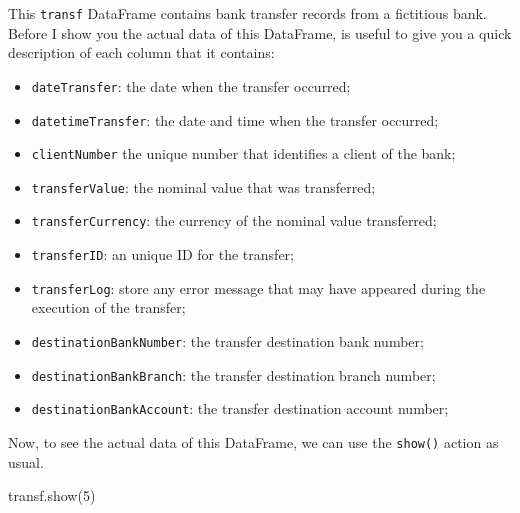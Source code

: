 \documentclass[
  11pt,
  letterpaper,
  DIV=11,
  numbers=noendperiod]{scrreprt}
\newenvironment{Shaded}{\begin{snugshade}}{\end{snugshade}}
\newcommand{\DecValTok}[1]{\textcolor[rgb]{0.68,0.00,0.00}{#1}}
\newcommand{\NormalTok}[1]{\textcolor[rgb]{0.00,0.23,0.31}{#1}}
\providecommand{\tightlist}{%
  \setlength{\itemsep}{0pt}\setlength{\parskip}{0pt}}\usepackage{longtable,booktabs,array}
\begin{document}
This \texttt{transf} DataFrame contains bank transfer records from a
fictitious bank. Before I show you the actual data of this DataFrame, is
useful to give you a quick description of each column that it contains:

\begin{itemize}
\tightlist
\item
  \texttt{dateTransfer}: the date when the transfer occurred;
\item
  \texttt{datetimeTransfer}: the date and time when the transfer
  occurred;
\item
  \texttt{clientNumber} the unique number that identifies a client of
  the bank;
\item
  \texttt{transferValue}: the nominal value that was transferred;
\item
  \texttt{transferCurrency}: the currency of the nominal value
  transferred;
\item
  \texttt{transferID}: an unique ID for the transfer;
\item
  \texttt{transferLog}: store any error message that may have appeared
  during the execution of the transfer;
\item
  \texttt{destinationBankNumber}: the transfer destination bank number;
\item
  \texttt{destinationBankBranch}: the transfer destination branch
  number;
\item
  \texttt{destinationBankAccount}: the transfer destination account
  number;
\end{itemize}

Now, to see the actual data of this DataFrame, we can use the
\texttt{show()} action as usual.

\begin{Shaded}
\begin{Highlighting}[]
\NormalTok{transf.show(}\DecValTok{5}\NormalTok{)}
\end{Highlighting}
\end{Shaded}
\end{document}
